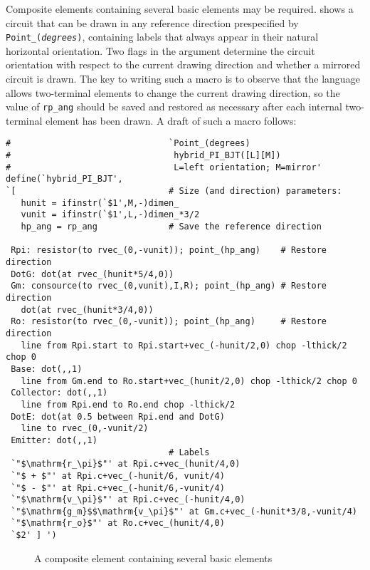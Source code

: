 Composite elements containing several basic elements may be
required.   shows a circuit that can be drawn in
any reference direction prespecified by {\tt Point\_({\sl degrees})},
containing labels that always appear in their natural horizontal orientation.
Two flags in the argument determine the circuit orientation with respect to
the current drawing direction and whether a mirrored circuit is drawn.  
The key to writing such a macro is to observe that the \pic language
allows two-terminal elements to change the current drawing direction,
so the value of {\tt rp\_ang} should be saved and restored as necessary
after each internal two-terminal element has been drawn.
A draft of such a macro follows:
\begin{verbatim}
#                               `Point_(degrees)
#                                hybrid_PI_BJT([L][M])
#                                L=left orientation; M=mirror'
define(`hybrid_PI_BJT',
`[                              # Size (and direction) parameters:
   hunit = ifinstr(`$1',M,-)dimen_
   vunit = ifinstr(`$1',L,-)dimen_*3/2
   hp_ang = rp_ang              # Save the reference direction

 Rpi: resistor(to rvec_(0,-vunit)); point_(hp_ang)    # Restore direction
 DotG: dot(at rvec_(hunit*5/4,0))
 Gm: consource(to rvec_(0,vunit),I,R); point_(hp_ang) # Restore direction
   dot(at rvec_(hunit*3/4,0))
 Ro: resistor(to rvec_(0,-vunit)); point_(hp_ang)     # Restore direction
   line from Rpi.start to Rpi.start+vec_(-hunit/2,0) chop -lthick/2 chop 0
 Base: dot(,,1)
   line from Gm.end to Ro.start+vec_(hunit/2,0) chop -lthick/2 chop 0
 Collector: dot(,,1)
   line from Rpi.end to Ro.end chop -lthick/2
 DotE: dot(at 0.5 between Rpi.end and DotG)
   line to rvec_(0,-vunit/2)
 Emitter: dot(,,1)
                                # Labels
 `"$\mathrm{r_\pi}$"' at Rpi.c+vec_(hunit/4,0)
 `"$ + $"' at Rpi.c+vec_(-hunit/6, vunit/4)
 `"$ - $"' at Rpi.c+vec_(-hunit/6,-vunit/4)
 `"$\mathrm{v_\pi}$"' at Rpi.c+vec_(-hunit/4,0)
 `"$\mathrm{g_m}$$\mathrm{v_\pi}$"' at Gm.c+vec_(-hunit*3/8,-vunit/4)
 `"$\mathrm{r_o}$"' at Ro.c+vec_(hunit/4,0)
 `$2' ] ')
\end{verbatim}
\begin{figure}[ht]
   \vspace*{-0.5ex}
   
   \vspace*{-0.5ex}
   \caption{A composite element containing several basic elements}
   \label{HybridPi}
   \end{figure}

